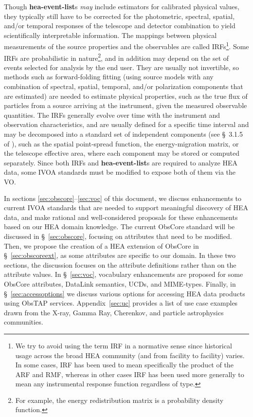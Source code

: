 \documentclass[11pt,a4paper]{ivoa}
\begin{document}
Though {\bf hea-event-list}s {\em may\/} include estimators for calibrated physical values, they typically still have to be corrected for the photometric, spectral, spatial, and/or temporal responses of the telescope and detector combination to yield scientifically interpretable information. The mappings between physical measurements of the source properties and the observables are called \glspl{IRF}\footnote{We try to avoid using the term \gls{IRF} in a normative sense since historical usage across the broad \gls{HEA} community (and from facility to facility) varies. In some cases, \gls{IRF} has been used to mean specifically the product of the \gls{ARF} and \gls{RMF}, whereas in other cases \gls{IRF} has been used more generally to mean any instrumental response function regardless of type.}.  Some \glspl{IRF} are probabilistic in nature\footnote{For example, the energy redistribution matrix is a probability density function.}, and in addition may depend on the set of events selected for analysis by the end user.  They are usually not invertible, so methods such as forward-folding fitting (using source models with any combination of spectral, spatial, temporal, and/or polarization components that are estimated) are needed to estimate physical properties, such as the true flux of particles from a source arriving at the instrument, given the measured observable quantities. The \glspl{IRF} generally evolve over time with the instrument and observation characteristics, and are usually defined for a specific time interval and may be decomposed into a standard set of independent components (see \S~3.1.5 of \citealt{2024ivoa.note.heig}), such as the spatial point-spread function, the energy-migration matrix, or the telescope effective area, where each component may be stored or computed separately.  Since both \glspl{IRF} and {\bf hea-event-list}s are required to analyze \gls{HEA} data, some \gls{IVOA} standards must be modified to expose both of them via the \gls{VO}.

In sections \ref{sec:obscore}--\ref{sec:voc} of this document, we discuss enhancements to current \gls{IVOA} standards that are needed to support meaningful discovery of \gls{HEA} data, and make rational and well-considered proposals for these enhancements based on our \gls {HEA} domain knowledge.  The current ObsCore standard will be discussed in \S~\ref{sec:obscore}, focusing on attributes that need to be modified. Then, we propose the creation of a \gls{HEA} extension of ObsCore in \S~\ref{sec:obscoreext}, as some attributes are specific to our domain. In these two sections, the discussion focuses on the attribute definitions rather than on the attribute values. In \S~\ref{sec:voc}, vocabulary enhancements are proposed for some ObsCore attributes, DataLink semantics, UCDs, and MIME-types. Finally, in \S~\ref{sec:accessoptions} we discuss various options for accessing \gls{HEA} data products using ObsTAP services. Appendix~\ref{sec:uc} provides a list of use case examples drawn from the X-ray, Gamma Ray, Cherenkov, and particle astrophysics communities.
\end{document}

